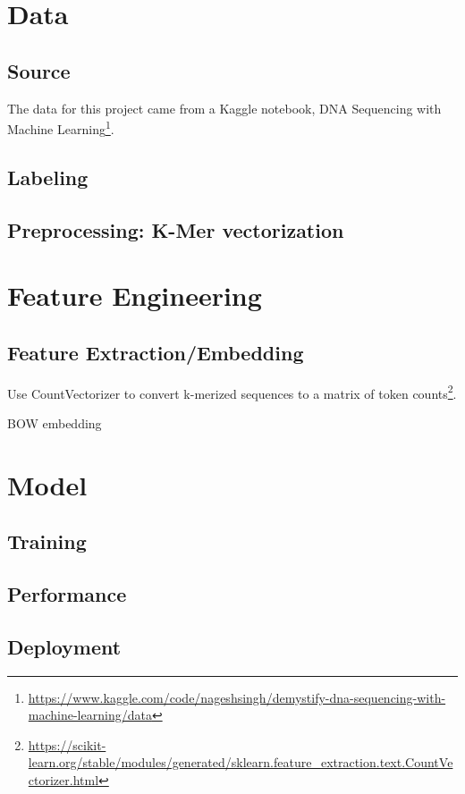 \section{Data}

\subsection{Source}

The data for this project came from a Kaggle notebook, DNA Sequencing with Machine Learning\footnote{\url{https://www.kaggle.com/code/nageshsingh/demystify-dna-sequencing-with-machine-learning/data}}.

\subsection{Labeling}


\subsection{Preprocessing: K-Mer vectorization}


\section{Feature Engineering}

\subsection{Feature Extraction/Embedding}

Use CountVectorizer to convert k-merized sequences to a matrix of token counts\footnote{\url{https://scikit-learn.org/stable/modules/generated/sklearn.feature_extraction.text.CountVectorizer.html}}.

BOW embedding

\section{Model}

\subsection{Training}

\subsection{Performance}

\subsection{Deployment}

